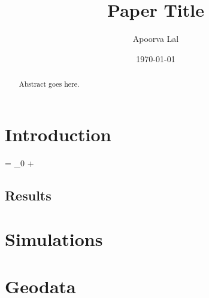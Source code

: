 \documentclass[12pt,reqno, titlepage]{amsart} %
\title{Paper Title}
\author{Apoorva Lal}
\date{\today}
\begin{document}
\begin{abstract} Abstract goes here.
\end{abstract}

\maketitle

\listoftodos


\linenumbers
\modulolinenumbers[5]
\thepart{}
\section{Introduction} \label{intro}


\beq
{} = \alpha_0 + \beta {}
\eeq

\subsection{Results}


\lipsum[5]
\textcite{sutton2018reinforcement}

\begin{figure}[tb]
  \centering
  \label{fig:figure1}
\end{figure}


\renewcommand{\mkbibnamefamily}[1]{\textsc{#1}}
\printbibliography

\newpage
\renewcommand{\thetable}{A\arabic{table}}
\renewcommand{\thefigure}{A\arabic{figure}}
\setcounter{table}{0}
\setcounter{figure}{0}

\appendix

\begin{refsection}
\section{Simulations} %
\label{sec:simulations}

\section{Geodata} %
\label{sec:geodata}
\textcite{jordahlGeoPandasPythonTools2014}


\printbibliography
\end{refsection}


\medskip
\end{document}
